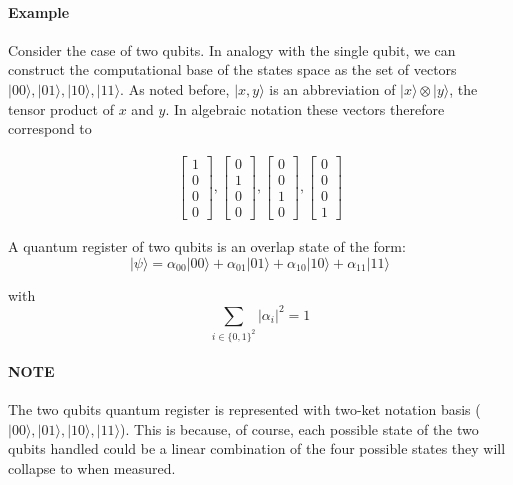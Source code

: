 \documentclass[a4paper,10pt]{article}
\begin{document}
\paragraph{Example} Consider the case of two qubits. In analogy with the single qubit, we can construct the computational base of the states space as the set of vectors $|00\rangle, |01\rangle, |10\rangle, |11\rangle$. As noted before, $|x, y\rangle$ is an abbreviation of $|x\rangle \otimes |y\rangle$, the tensor product of $x$ and $y$. In algebraic notation these vectors therefore correspond to

\begin{equation*}
\begin{aligned}
{\begin{bmatrix}
1 \\
0 \\
0 \\
0
\end{bmatrix}},
{\begin{bmatrix}
0 \\
1 \\
0 \\
0
\end{bmatrix}},
{\begin{bmatrix}
0 \\
0 \\
1 \\
0
\end{bmatrix}},
{\begin{bmatrix}
0 \\
0 \\
0 \\
1
\end{bmatrix}}
\end{aligned}
\end{equation*}

A quantum register of two qubits is an overlap state of the form:
$$|\psi\rangle = \alpha_{00}|00\rangle + \alpha_{01}|01\rangle + \alpha_{10}|10\rangle + \alpha_{11}|11\rangle$$

with $$\sum\limits_{i \in {\{0, 1\}}^2}{|\alpha_i|}^2 = 1$$

\paragraph{NOTE} The two qubits quantum register is represented with two-ket notation basis ($|00\rangle, |01\rangle, |10\rangle, |11\rangle$). This is because, of course, each possible state of the two qubits handled could be a linear combination of the four possible states they will collapse to when measured.
\end{document}
